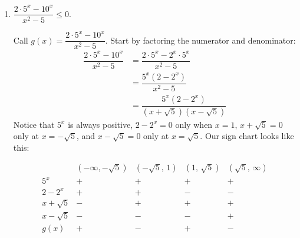 \documentclass{ximera}
\begin{document}
\begin{problem}
\begin{enumerate}
\begin{explanation}
				For $x < -1$, we find $x^3 < 0$, $(2x-5)^2 > 0$, and $x+1 < 0$.  Together, that means the value of $f(x)$ is  
				$\displaystyle \dfrac{ \textrm{negative} \cdot \textrm{positive}}{\textrm{negative}}$.  It is, therefore, positive in that region, and makes up
				part of our solution.  We cannot include the endpoint $x=-1$ in the solution, as the fraction is undefined there.
				
				In the same way, we see that in the intervals $\left( 0, \frac{5}{2} \right)$ and $\left( \frac{5}{2}, 0\right)$, $f(x)$ is also positive.
				Notice that the inequality is NOT satisfied at $x=\frac{5}{2}$, since $f(\frac{5}{2})$ equals zero.  
				
				The solution is $\left( -\infty, -1 \right) \cup \left( 0, \frac{5}{2} \right) \cup \left( \frac{5}{2}, \infty \right)$.
			\end{explanation}

		\item $\displaystyle  \dfrac{2\cdot 5^x - 10^x}{x^2-5} \leq 0$.
\begin{explanation}
				Call $g(x) = \dfrac{2\cdot 5^x - 10^x}{x^2-5}$.
				Start by factoring the numerator and denominator:
				\begin{align*} 
					\dfrac{2\cdot 5^x - 10^x}{x^2-5} &= \dfrac{2\cdot 5^x - 2^x\cdot 5^x}{x^2-5}\\
						&= \dfrac{5^x(2 - 2^x)}{x^2-5}\\						
						&= \dfrac{5^x(2 - 2^x)}{(x+\sqrt{5})(x-\sqrt{5})}
				\end{align*}
				Notice that $5^x$ is always positive, $2-2^x=0$ only when $x=1$, $x+\sqrt{5}=0$ only at $x=-\sqrt{5}$, 
				and $x-\sqrt{5}=0$ only at $x=\sqrt{5}$. Our sign chart looks like this:
				

\[
\begin{array}{c|cccc}
 & (-\infty,-\sqrt{5}) & \left(-\sqrt{5},\,1\right) & \left(1,\,\sqrt{5}\right) & \left(\sqrt{5},\,\infty\right)\\\hline
5^{x}        & + & + & + & +\\
2-2^{x}      & + & + & - & -\\
x+\sqrt{5}   & - &  + & + & +\\
x-\sqrt{5}   & - & - & - &  +\\
g(x)         & + & - & + & -\\
\end{array}
\]
				

\end{explanation}
\end{enumerate}
\end{problem}
\end{document}
